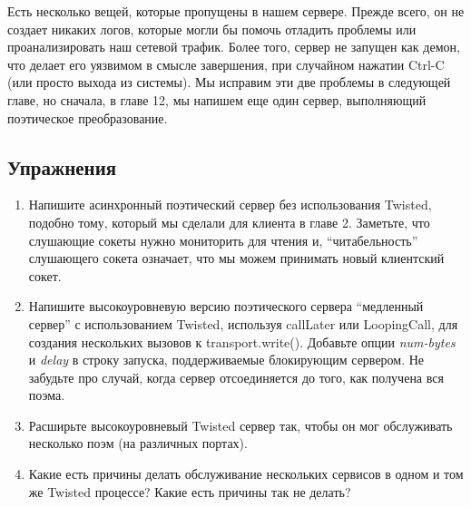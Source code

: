 Есть несколько вещей, которые пропущены в нашем сервере. 
Прежде всего, он не создает никаких логов, которые 
могли бы помочь отладить проблемы или проанализировать 
наш сетевой трафик. Более того, сервер не запущен как 
демон, что делает его уязвимом в смысле завершения, 
при случайном нажатии Ctrl-C (или просто выхода из системы). 
Мы исправим эти две проблемы в следующей главе, но сначала, в 
главе 12, мы напишем еще один сервер, выполняющий 
поэтическое преобразование.


\subsection{Упражнения}

\begin{enumerate}

\item Напишите асинхронный поэтический сервер без 
использования Twisted, подобно тому, который мы сделали для 
клиента в главе 2. Заметьте, что слушающие сокеты нужно 
мониторить для чтения и, ``читабельность'' слушающего сокета 
означает, что мы можем принимать новый клиентский сокет.

\item Напишите высокоуровневую версию поэтического сервера 
``медленный сервер'' с использованием Twisted, 
используя callLater или \newline LoopingCall, 
для создания нескольких вызовов к 
transport.write(). Добавьте опции  \textit{num-bytes} и 
\textit{delay}  
в строку запуска, поддерживаемые блокирующим сервером. Не 
забудьте про случай, когда сервер отсоединяется до того, как 
получена вся поэма.

\item Расширьте высокоуровневый Twisted сервер так, чтобы он мог 
обслуживать несколько поэм (на различных портах).

\item Какие есть причины делать обслуживание нескольких сервисов в 
одном и том же Twisted процессе? Какие есть причины так не делать?

\end{enumerate}

